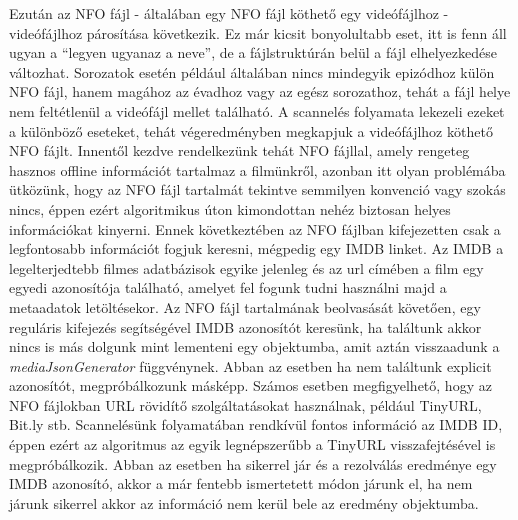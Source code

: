Ezután az NFO fájl - általában egy NFO fájl köthető egy videófájlhoz - videófájlhoz párosítása következik. Ez már kicsit bonyolultabb eset, itt is fenn áll ugyan a ``legyen ugyanaz a neve'', de a fájlstruktúrán belül a fájl elhelyezkedése változhat. Sorozatok esetén például általában nincs mindegyik epizódhoz külön NFO fájl, hanem magához az évadhoz vagy az egész sorozathoz, tehát a fájl helye nem feltétlenül a videófájl mellet található. A scannelés folyamata lekezeli ezeket a különböző eseteket, tehát végeredményben megkapjuk a videófájlhoz köthető NFO fájlt.
Innentől kezdve rendelkezünk tehát NFO fájllal, amely rengeteg hasznos offline információt tartalmaz a filmünkről, azonban itt olyan problémába ütközünk, hogy az NFO fájl tartalmát tekintve semmilyen konvenció vagy szokás nincs, éppen ezért algoritmikus úton kimondottan nehéz biztosan helyes információkat kinyerni. Ennek következtében az NFO fájlban kifejezetten csak a legfontosabb információt fogjuk keresni, mégpedig egy IMDB linket. Az IMDB a legelterjedtebb filmes adatbázisok egyike jelenleg és az url címében a film egy egyedi azonosítója található, amelyet fel fogunk tudni használni majd a metaadatok letöltésekor. Az NFO fájl tartalmának beolvasását követően, egy reguláris kifejezés segítségével IMDB azonosítót keresünk, ha találtunk akkor nincs is más dolgunk mint lementeni egy objektumba, amit aztán visszaadunk a {\it mediaJsonGenerator } függvénynek. Abban az esetben ha nem találtunk explicit azonosítót, megpróbálkozunk másképp.
Számos esetben megfigyelhető, hogy az NFO fájlokban URL rövidítő szolgáltatásokat használnak, például TinyURL, Bit.ly stb. Scannelésünk folyamatában rendkívül fontos információ az IMDB ID, éppen ezért az algoritmus az egyik legnépszerűbb a TinyURL visszafejtésével is megpróbálkozik. Abban az esetben ha sikerrel jár és a rezolválás eredménye egy IMDB azonosító, akkor a már fentebb ismertetett módon járunk el, ha nem járunk sikerrel akkor az információ nem kerül bele az eredmény objektumba.

